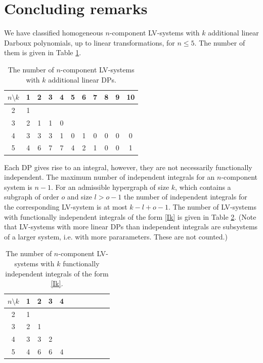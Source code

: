 \documentclass{article}
\begin{document}
\section{Concluding remarks}
We have classified homogeneous $n$-component LV-systems with $k$ additional linear Darboux polynomials, up to linear transformations, for $n\leq5$. The number of them is given in Table \ref{cls}.
\begin{table}[h]
\begin{center}
\begin{tabular}{c|cccccccccc}
$n \setminus k$ & 1 & 2 & 3 & 4 & 5 & 6 & 7 & 8 & 9 & 10 \\
\hline
2 & 1 & & & & & & & & & \\
3 & 2 & 1 & 1 & 0 & & & & & & \\
4 & 3 & 3 & 3 & 1 & 0 & 1 & 0 & 0 & 0 & 0 \\
5 & 4 & 6 & 7 & 7 & 4 & 2 & 1 & 0 & 0 & 1 \\
\end{tabular}
\vspace{2mm}

\parbox{12.5cm}{\caption{\label{cls} The number of $n$-component LV-systems with $k$ additional linear DPs.}}
\end{center}
\end{table}
\vspace{-8pt} 

Each DP gives rise to an integral, however, they are not necessarily functionally independent. The maximum number of independent integrals for an $n$-component system is $n-1$. For an admissible hypergraph of size $k$, which contains a subgraph of order $o$ and size $l>o-1$ the number of independent integrals for the corresponding LV-system is at most $k-l+o-1$. The number of LV-systems with functionally independent integrals of the form \eqref{Ik} is given in Table \ref{cli}. (Note that LV-systems with more linear DPs than independent integrals are subsystems of a larger system, i.e. with more pararameters. These are not counted.)

\begin{table}[h]
\begin{center}
\begin{tabular}{c|cccccccccc}
$n \setminus k$ & 1 & 2 & 3 & 4 \\
\hline
2 & 1 & & & \\
3 & 2 & 1 & &  \\
4 & 3 & 3 & 2 & \\
5 & 4 & 6 & 6 & 4 \\
\end{tabular}
\vspace{2mm}

\parbox{12.5cm}{\caption{\label{cli} The number of $n$-component LV-systems with $k$ functionally independent integrals of the form \eqref{Ik}.}}
\end{center}
\end{table}
\vspace{-8pt} 
\end{document}
